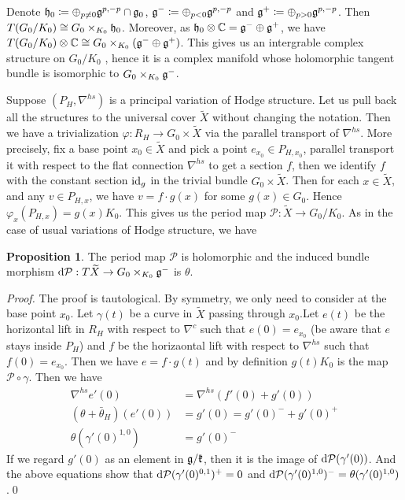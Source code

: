 \documentclass[aspectratio=169, 10pt]{beamer}
\theoremstyle{definition}
\theoremstyle{example}
\newtheorem{proposition}[theorem]{Proposition}
\begin{document}
	\begin{frame}
		Denote $\mathfrak{h}_0\coloneqq \oplus_{p\neq 0}\mathfrak{g}^{p,-p}\cap \mathfrak{g}_0$, $\mathfrak{g}^-\coloneqq \oplus_{p<0}\mathfrak{g}^{p,-p}$ and $\mathfrak{g}^+\coloneqq \oplus_{p>0}\mathfrak{g}^{p,-p}$. Then $T(G_0/K_0)\cong G_0\times_{K_0} \mathfrak{h}_0$. Moreover, as $\mathfrak{h}_0\otimes \mathbb{C}=\mathfrak{g}^{-}\oplus \mathfrak{g}^{+}$, we have $T(G_0/K_0)\otimes \mathbb{C}\cong G_0\times_{K_0} (\mathfrak{g}^{-}\oplus \mathfrak{g}^{+})$. This gives us an intergrable complex structure on $G_0/K_0$ , hence it is a complex manifold whose holomorphic tangent bundle is isomorphic to $G_0\times_{K_0} \mathfrak{g}^{-}$.

		Suppose $(P_H, \nabla^{hs})$ is a principal variation of Hodge structure. Let us pull back all the structures to the universal cover $\widetilde{X}$ without changing the notation. Then we have a trivialization $\varphi: R_H \to G_0\times \widetilde{X}$ via the parallel transport of $\nabla^{hs}$. More precisely, fix a base point $x_0\in \widetilde{X}$ and pick a point $e_{x_0}\in P_{H,x_0}$, parallel transport it with respect to the flat connection $\nabla^{hs}$ to get a section $f$, then we identify $f$ with the constant section $\mathrm{id}_g$ in the trivial bundle $G_0\times \widetilde{X}$. Then for each $x\in \widetilde{X}$, and any $v\in P_{H,x}$, we have $v=f\cdot g(x)$ for some $g(x)\in G_0$. Hence $\varphi_x(P_{H,x})=g(x)K_0$. This gives us the period map $\mathcal{P}: \widetilde{X}\to G_0/K_0$. As in the case of usual variations of Hodge structure, we have 
	\end{frame}
	\begin{frame}[allowframebreaks]
		\begin{proposition}
			The period map $\mathcal{P}$ is holomorphic and the induced bundle morphism $\mathop{}\!\mathrm{d}\mathcal{P}:T\widetilde{X}\to G_0\times_{K_0} \mathfrak{g}^{-}$ is $\theta$.
		\end{proposition}
		\noindent \textit{Proof.} 
			The proof is tautological. By symmetry, we only need to consider at the base point $x_0$. Let $\gamma(t)$ be a curve in $\widetilde{X}$ passing through $x_0$.Let $e(t)$ be the horizontal lift in $R_H$ with respect to $\nabla^c$ such that $e(0)=e_{x_0}$ (be aware that $e$ stays inside $P_H$) and $f$ be the horizaontal lift with respect to $\nabla^{hs}$ such that $f(0)=e_{x_0}$. Then we have $e=f\cdot g(t)$ and by definition $g(t)K_0$ is the map $\mathcal{P}\circ \gamma$. Then we have 
			\begin{align*}
				\nabla^{hs}e'(0)&=\nabla^{hs}(f'(0)+g'(0))\\
				(\theta+\bar{\theta}_H)(e'(0))&=g'(0)=g'(0)^{-}+g'(0)^{+}\\
				\theta(\gamma'(0)^{1,0})&=g'(0)^{-}
			\end{align*}
			If we regard $g'(0)$ as an element in $\mathfrak{g}/\mathfrak{k}$, then it is the image of $\mathop{}\!\mathrm{d}\mathcal{P}(\gamma'(0))$. And the above equations show that $\mathop{}\!\mathrm{d}\mathcal{P}(\gamma'(0)^{0,1})^{+}=0$ and $\mathop{}\!\mathrm{d}\mathcal{P}(\gamma'(0)^{1,0})^{-}=\theta(\gamma'(0)^{1,0})$.\hfill \qed
	\end{frame}
\end{document}
